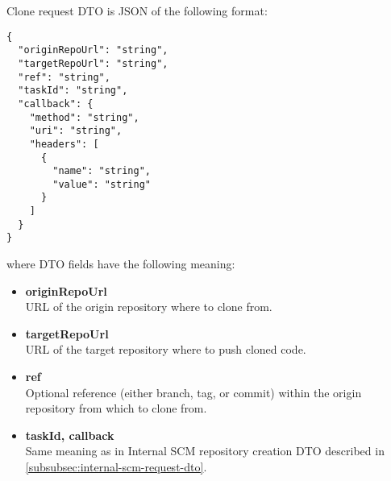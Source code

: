 \documentclass[../main.tex]{subfiles}
\begin{document}
Clone request DTO is JSON of the following format:

\begin{lstlisting}[numbers=none]
{
  "originRepoUrl": "string",
  "targetRepoUrl": "string",
  "ref": "string",
  "taskId": "string",
  "callback": {
    "method": "string",
    "uri": "string",
    "headers": [
      {
        "name": "string",
        "value": "string"
      }
    ]
  }
}
\end{lstlisting}

where DTO fields have the following meaning:
\begin{itemize}
    \item \textbf{originRepoUrl}\\
    URL of the origin repository where to clone from.

    \item \textbf{targetRepoUrl}\\
    URL of the target repository where to push cloned code.

    \item \textbf{ref}\\
    Optional reference (either branch, tag, or commit) within the origin repository from which to clone from.

    \item \textbf{taskId, callback}\\
    Same meaning as in Internal SCM repository creation DTO described in \ref{subsubsec:internal-scm-request-dto}.
\end{itemize}
\end{document}
